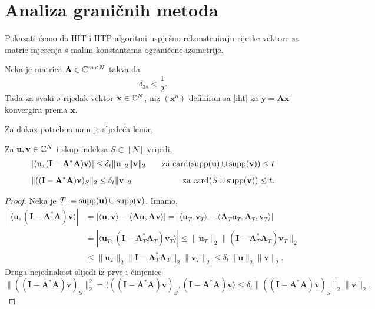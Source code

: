 \documentclass[a4paper,twoside,12pt]{memoir} %
\newcommand{\vect}[1]{\mathbf{#1}}
\renewcommand{\vec}{\vect}
\newcommand{\card}{\text{\normalfont{card}}}
\newcommand{\supp}{\text{\normalfont{supp}}}
\newcommand{\norm}[1]{\|{#1}\|}
\begin{document}
\section[Analiza grani\v{c}nih metoda][Analiza grani\v{c}nih metoda]{Analiza grani\v{c}nih metoda}
Pokazati \'cemo da IHT i HTP algoritmi uspje\v{s}no rekonstruiraju rijetke vektore za matric mjerenja s malim konstantama ograni\v{c}ene izometrije.
\begin{thm} \label{tm:6:15}
    Neka je matrica $\vec A \in \C^{m \times N}$ takva da 
    \begin{equation}\label{6:24}
        \delta_{3s} < \frac{1}{2}. 
    \end{equation}
    Tada za svaki $s$-rijedak vektor $\vec x \in \C^N$, niz $(\vec x^n)$ definiran sa \eqref{iht} za $\vec y = \vec {Ax}$ konvergira prema $\vec x$.
\end{thm}
Za dokaz potrebna nam je sljede\'ca lema,
\begin{lem}\label{lem:6:16}
    Za $\vec u, \vec v \in \C^N$ i skup indeksa $S \subset [N]$ vrijedi,
    \begin{align*}
        &|\langle \vec u , (\vec I - \vec A^* \vec A)\vec v \rangle|  \leq \delta_t \norm{\vec u}_2 \norm{\vec v}_2 \quad & \text{za } \card(\supp(\vec u) \cup \supp(\vec v))\leq t\\[0.5em]
        &\norm{((\vec I - \vec A^* \vec A)\vec v)_S}_2 \leq \delta_t \norm{\vec v}_2 \quad & \text{za } \card(S \cup \supp(\vec v)) \leq t.
    \end{align*}
\end{lem}
\begin{proof}
    Neka je $T:= \supp(\vec u) \cup \supp(\vec v)$. Imamo,
    \begin{align*}
        |\langle \vec u , (\vec I - \vec A^* \vec A)\vec v \rangle| &= |\langle \vec u, \vec v \rangle - \langle \vec{Au}, \vec{Av} \rangle| = |\langle \vec u_T, \vec v_T \rangle - \langle \vec A_T \vec u_T, \vec A_T, \vec v_T \rangle|\\[0.5em]
        &=|\langle \vec u_T, (\vec I - \vec A^*_T \vec A_T)\vec v_T \rangle| \leq \norm{\vec u_T}_2 \norm{(\vec I - \vec A^*_T \vec A_T)\vec v_T}_2\\[0.5em]
        &\leq \norm{\vec u_T}_2 \norm{\vec I - \vec A^*_T \vec A_T}_2 \norm{\vec v_T}_2 \leq \delta_t \norm{\vec u}_2 \norm{\vec v}_2.
    \end{align*}
    Druga nejednakost slijedi iz prve i \v{c}injenice
    \begin{equation*}
        \norm{((\vec I - \vec A^* \vec A)\vec v)_S}_2^2 = \langle ((\vec I - \vec A^* \vec A)\vec v)_S, (\vec I - \vec A^*\vec A)\vec v \rangle \leq \delta_t \norm{((\vec I - \vec A^*\vec A)\vec v)_S}_2 \norm{\vec v}_2.
    \end{equation*}
\end{proof}
\end{document}
